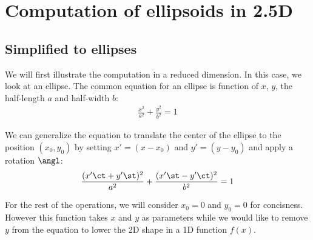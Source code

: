 \zzcommand{\ct}{\cos \angl}
\zzcommand{\cct}{\cos^2 \angl}
\zzcommand{\st}{\sin \angl}
\zzcommand{\sst}{\sin^2 \angl}

\zzcommand{\cp}{\cos \anglTwo}
\zzcommand{\ccp}{\cos^2 \anglTwo}
\zzcommand{\sp}{\sin \anglTwo}
\zzcommand{\ssp}{\sin^2 \anglTwo}


\chapter{Computation of ellipsoids in 2.5D}
\label{chap:computation-ellipsoid}


\section{Simplified to ellipses}

We will first illustrate the computation in a reduced dimension. In this case, we look at an ellipse.
The common equation for an ellipse is function of $x$, $y$, the half-length $a$ and half-width $b$:
\begin{align}
    \label{eq:ellipsoid_simplified-ellipse}
    \frac{x^2}{a^2} + \frac{y^2}{b^2} = 1
\end{align}

We can generalize the equation to translate the center of the ellipse to the position $(x_0, y_0)$ by setting $x'=(x-x_0)$ and $y'=(y-y_0)$ and apply a rotation $\angl$:
\begin{align}
    \label{eq:ellipsoid_general-ellipse}
    \frac{(x' \ct + y' \st)^2}{a^2} + \frac{(x' \st - y' \ct)^2}{b^2} = 1
\end{align}

For the rest of the operations, we will consider $x_0=0$ and $y_0=0$ for concisness.
However this function takes $x$ and $y$ as parameters while we would like to remove $y$ from the equation to lower the 2D shape in a 1D function $f(x)$.

